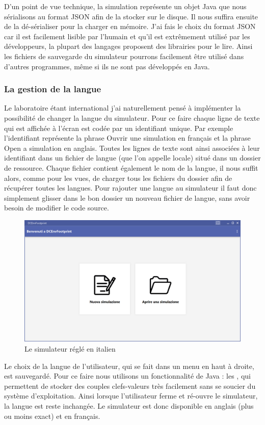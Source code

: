 D'un point de vue technique, la simulation représente un objet Java que nous sérialisons au format JSON afin de la stocker sur le disque. Il nous suffira ensuite de la dé-sérialiser pour la charger en mémoire. J'ai fais le choix du format JSON car il est facilement lisible par l'humain et qu'il est extrêmement utilisé par les développeurs, la plupart des langages proposent des librairies pour le lire. Ainsi les fichiers de sauvegarde du simulateur pourrons facilement être utilisé dans d'autres programmes, même si ils ne sont pas développés en Java.\\

\subsubsection{La gestion de la langue}
Le laboratoire étant international j'ai naturellement pensé à implémenter la possibilité de changer la langue du simulateur. Pour ce faire chaque ligne de texte qui est affichée à l'écran est codée par un identifiant unique. Par exemple l'identifiant  représente la phrase \og Ouvrir une simulation \fg{} en français et la phrase \og Open a simulation \fg{} en anglais. Toutes les lignes de texte sont ainsi associées à leur identifiant dans un fichier de langue (que l'on appelle locale) situé dans un dossier de ressource. Chaque fichier contient également le nom de la langue, il nous suffit alors, comme pour les vues, de charger tous les fichiers du dossier afin de récupérer toutes les langues. Pour rajouter une langue au simulateur il faut donc simplement glisser dans le bon dossier un nouveau fichier de langue, sans avoir besoin de modifier le code source.

\begin{figure}[h]
	\begin{center}
		\includegraphics[scale=0.50]{partie2/images/italien.png}
		\caption{Le simulateur réglé en italien}
	\end{center}
\end{figure}
Le choix de la langue de l'utilisateur, qui se fait dans un menu en haut à droite, est sauvegardé. Pour ce faire nous utilisons un fonctionnalité de Java : les , qui permettent de stocker des couples clefs-valeurs très facilement sans se soucier du système d'exploitation. Ainsi lorsque l'utilisateur ferme et ré-ouvre le simulateur, la langue est reste inchangée. Le simulateur est donc disponible en anglais (plus ou moins exact) et en français.

